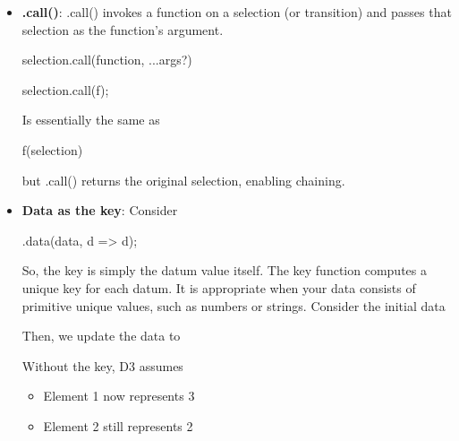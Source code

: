 \documentclass{report}
\begin{document}
\begin{itemize}
\begin{jscode}
{                    selection.exit()
                        .attr("opacity", 1)
                        .transition()
                        .duration(3000)
                            .attr("opacity", 0)
                            .remove()
                }
            \end{jscode}
        \item \textbf{.call()}: .call() invokes a function on a selection (or transition) and passes that selection as the function’s argument.
            \bigbreak \noindent 
            \begin{jscode}
            selection.call(function, ...args?)
            \end{jscode}
            \bigbreak \noindent 
            \begin{jscode}
            selection.call(f);
            \end{jscode}
            \bigbreak \noindent 
            Is essentially the same as 
            \bigbreak \noindent 
            \begin{jscode}
            f(selection)
            \end{jscode}
            \bigbreak \noindent 
            but .call() returns the original selection, enabling chaining.
        \item \textbf{Data as the key}: Consider
            \bigbreak \noindent 
            \begin{jscode}
                .data(data, d => d); 
            \end{jscode}
            \bigbreak \noindent 
            So, the key is simply the datum value itself. The key function computes a unique key for each datum. It is appropriate when your data consists of primitive unique values, such as numbers or strings.
            \bigbreak \noindent 
            Consider the initial data
            \bigbreak \noindent 
            \begin{jscode}
                [1,2,3]
            \end{jscode}
            \bigbreak \noindent 
            Then, we update the data to 
            \bigbreak \noindent 
            \begin{jscode}
                [3,2,1]
            \end{jscode}
            \bigbreak \noindent 
            Without the key, D3 assumes
            \begin{itemize}
                \item Element 1 now represents 3
                \item Element 2 still represents 2

\end{itemize}
\end{itemize}
\end{document}
